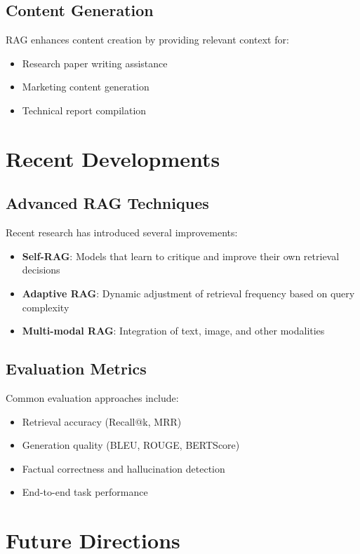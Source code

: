 \documentclass[]{article}
\begin{document}
\subsection{Content Generation}
RAG enhances content creation by providing relevant context for:
\begin{itemize}
    \item Research paper writing assistance
    \item Marketing content generation
    \item Technical report compilation
\end{itemize}

\section{Recent Developments}

\subsection{Advanced RAG Techniques}
Recent research has introduced several improvements:
\begin{itemize}
    \item \textbf{Self-RAG}: Models that learn to critique and improve their own retrieval decisions
    \item \textbf{Adaptive RAG}: Dynamic adjustment of retrieval frequency based on query complexity
    \item \textbf{Multi-modal RAG}: Integration of text, image, and other modalities
\end{itemize}

\subsection{Evaluation Metrics}
Common evaluation approaches include:
\begin{itemize}
    \item Retrieval accuracy (Recall@k, MRR)
    \item Generation quality (BLEU, ROUGE, BERTScore)
    \item Factual correctness and hallucination detection
    \item End-to-end task performance
\end{itemize}

\section{Future Directions}
\end{document}
